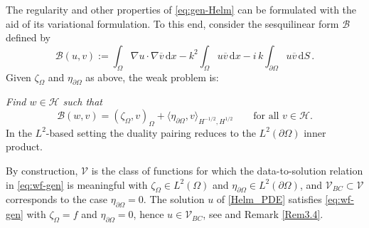 \documentclass[twoside,11pt]{article}
\def\d{{\mathrm d}}
\def\vbar{\overline{v}}
\def\Bc{{\mathcal B}}
\def\Hc{{\mathscr H}}
\def\Vc{{\mathscr V}}
\def\Vcbc{{\mathscr V}_{BC}}
\begin{document}
{The regularity and other properties of  \eqref{eq:gen-Helm} can be formulated with the aid of its variational formulation. To this end, consider the sesquilinear form $\Bc$   defined by 
%
\begin{equation}   \label{eq:bf}
  \Bc(u,v) := \int_\Omega \nabla u\cdot \nabla \vbar \, \d x - k^2 \int_\Omega  u\vbar\, \d x
           - i\, k\int_{\partial \Omega} u \vbar\, \d S \, .
\end{equation}
Given $\zeta_\Omega$ and $\eta_{\partial\Omega}$ as above, the weak problem is:

\emph{Find $w\in \Hc$ such that}
\begin{equation}\label{eq:wf-gen}
\Bc(w,v) = (\zeta_\Omega,v)_\Omega  + {\langle \eta_{\partial\Omega},   v \rangle_{H^{-1/2}, H^{1/2}}}
\qquad \text{for all } v\in \Hc .
\end{equation}
{In the $L^2$-based setting the duality pairing reduces to the $L^2(\partial\Omega)$ inner product.}

{By construction, $\Vc$ is the class of functions for which the data-to-solution relation in \eqref{eq:wf-gen} is meaningful with $\zeta_\Omega\in L^2(\Omega)$ and $\eta_{\partial\Omega}\in L^2(\partial\Omega)$, and $\Vcbc\subset\Vc$ corresponds to the case $\eta_{\partial\Omega}=0$. The solution $u$ of \eqref{Helm_PDE} satisfies \eqref{eq:wf-gen} with $\zeta_\Omega=f$ and $\eta_{\partial\Omega}=0$, hence $u\in\Vcbc$,} see \cite{Moiola_Spence2014} and Remark \ref{Rem3.4}.



}
\end{document}
